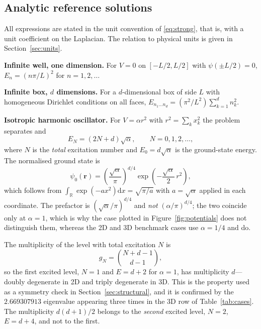 \documentclass[pdflatex,sn-mathphys-num]{sn-jnl}
\theoremstyle{thmstyleone}%
\theoremstyle{thmstyletwo}%
\theoremstyle{thmstylethree}%
\begin{document}
\begin{appendices}

\section{Analytic reference solutions}\label{app:analytic}

All expressions are stated in the unit convention of \eqref{eq:strong}, that is,
with a unit coefficient on the Laplacian. The relation to physical units is
given in Section~\ref{sec:units}.

\textbf{Infinite well, one dimension.} For $V = 0$ on $[-L/2, L/2]$ with
$\psi(\pm L/2) = 0$, $E_n = (n\pi/L)^2$ for $n = 1, 2, \dots$

\textbf{Infinite box, $d$ dimensions.} For a $d$-dimensional box of side $L$ with
homogeneous Dirichlet conditions on all faces,
$E_{n_1\dots n_d} = (\pi^2/L^2)\sum_{k=1}^{d} n_k^2$.

\textbf{Isotropic harmonic oscillator.} For $V = \alpha r^2$ with
$r^2 = \sum_k x_k^2$ the problem separates and
%
\begin{equation}\label{eq:harmlevels}
  E_N = (2N + d)\sqrt{\alpha} , \qquad N = 0, 1, 2, \dots ,
\end{equation}
%
where $N$ is the \emph{total} excitation number and $E_0 = d\sqrt{\alpha}$ is the
ground-state energy. The normalised ground state is
%
\begin{equation}\label{eq:harmgs}
  \psi_0(\mathbf{r}) = \left(\frac{\sqrt{\alpha}}{\pi}\right)^{d/4}
  \exp\!\left(-\frac{\sqrt{\alpha}}{2}\,r^2\right),
\end{equation}
%
which follows from $\int_{\mathbb{R}}\exp(-ax^2)\mathrm{d}x = \sqrt{\pi/a}$ with
$a = \sqrt{\alpha}$ applied in each coordinate. The prefactor is
$(\sqrt{\alpha}/\pi)^{d/4}$ and \emph{not} $(\alpha/\pi)^{d/4}$; the two coincide
only at $\alpha = 1$, which is why the case plotted in
Figure~\ref{fig:potentials} does not distinguish them, whereas the 2D and 3D
benchmark cases use $\alpha = 1/4$ and do.

The multiplicity of the level with total excitation $N$ is
%
\begin{equation}
  g_N = \binom{N + d - 1}{d - 1},
\end{equation}
%
so the first excited level, $N = 1$ and $E = d + 2$ for $\alpha = 1$, has
multiplicity $d$---doubly degenerate in 2D and triply degenerate in 3D. This is
the property used as a symmetry check in Section~\ref{sec:structural}, and it is
confirmed by the $2.669307913$ eigenvalue appearing three times in the 3D row of
Table~\ref{tab:cases}. The multiplicity $d(d+1)/2$ belongs to the \emph{second}
excited level, $N = 2$, $E = d + 4$, and not to the first.


\end{appendices}
\end{document}
